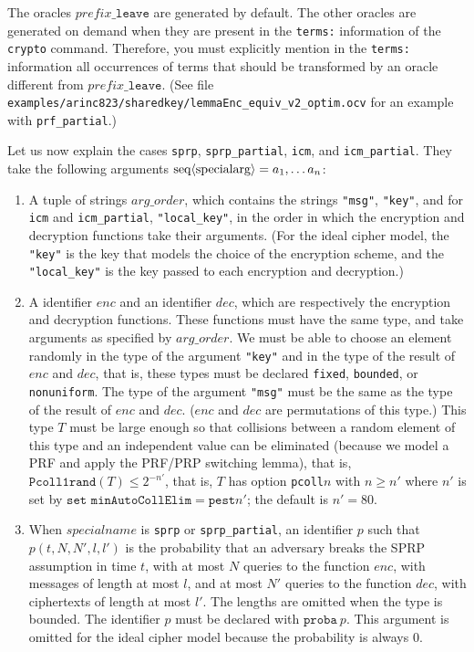 \begin{itemize}
\begin{itemize}
\end{itemize}
The oracles $\mathit{prefix}\texttt{\_leave}$ are generated
by default. The other oracles are generated on demand when
they are present in the \texttt{terms:} information of the
\texttt{crypto} command. Therefore, you must explicitly
mention in the \texttt{terms:} information all occurrences
of terms that should be transformed by an oracle different
from $\mathit{prefix}\texttt{\_leave}$.
(See file \nolinkurl{examples/arinc823/sharedkey/lemmaEnc_equiv_v2_optim.ocv}
for an example with \texttt{prf\_partial}.)

Let us now explain the cases \texttt{sprp}, \texttt{sprp\_partial},
  \texttt{icm}, and \texttt{icm\_partial}.
  They take the following arguments $\textrm{seq}\langle\textrm{specialarg}\rangle = a_1, \dots a_n$:
\begin{enumerate}

\item A tuple of strings $\mathit{arg\_order}$, which contains the strings
\texttt{"msg"}, \texttt{"key"}, and for \texttt{icm} and \texttt{icm\_partial}, \texttt{"local\_key"}, in the order in which the encryption and decryption functions take their arguments. (For the ideal cipher model, the \texttt{"key"} is the key that models the choice of the encryption scheme, and the \texttt{"local\_key"} is the key passed to each encryption and decryption.)

\item A identifier $\mathit{enc}$ and an identifier $\mathit{dec}$, which are respectively the encryption and decryption functions. These functions must have the same type, and take arguments as specified by $\mathit{arg\_order}$.
We must be able to choose an element randomly in the type of the argument \texttt{"key"}
and in the type of the result of $\mathit{enc}$ and $\mathit{dec}$, that is, these types must be
declared \texttt{fixed}, \texttt{bounded}, or \texttt{nonuniform}.
The type of the argument \texttt{"msg"} must be the same as the type of the result of $\mathit{enc}$ and $\mathit{dec}$. ($\mathit{enc}$ and $\mathit{dec}$ are permutations of this type.)
This type $T$ must be large enough so that collisions between a random element of
this type and an independent value can be eliminated (because we
model a PRF and apply the PRF/PRP switching lemma), that is,
$\texttt{Pcoll1rand}(T) \leq 2^{-n'}$, that is, $T$ has
option \texttt{pcoll$n$} with $n \geq n'$ where $n'$ is set by
$\texttt{set minAutoCollElim} = \texttt{pest}n'$; the default is $n' =
80$.

\item When $\mathit{specialname}$ is \texttt{sprp} or
  \texttt{sprp\_partial}, an identifier $\mathit{p}$ such that
  $\mathit{p}(t, N, N', l, l')$ is the probability that an adversary
  breaks the SPRP assumption in time $t$, with at most $N$ queries to
  the function $\mathit{enc}$, with messages of length at most $l$,
  and at most $N'$ queries to the function $\mathit{dec}$, with
  ciphertexts of length at most $l'$. The lengths are omitted when the
  type is bounded. The identifier $\mathit{p}$ must be declared with
  $\texttt{proba}\ p$. This argument is omitted for the ideal cipher
  model because the probability is always 0.


\end{enumerate}
\end{itemize}
